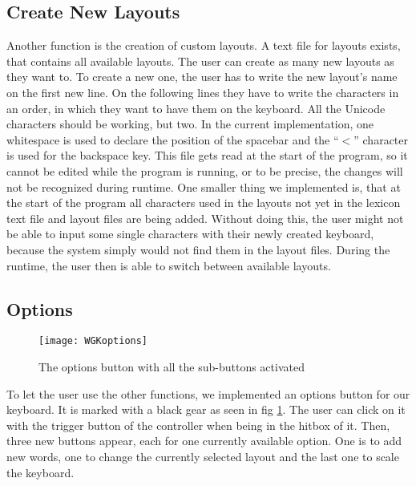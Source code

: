 \subsection{Create New Layouts}
Another function is the creation of custom layouts. A text file for layouts exists, that contains all available layouts. The user can create as many new layouts as they want to. To create a new one, the user has to write the new layout's name on the first new line. On the following lines they have to write the characters in an order, in which they want to have them on the keyboard. All the Unicode characters should be working, but two. In the current implementation, one whitespace is used to declare the position of the spacebar and the ``$<$'' character is used for the backspace key. This file gets read at the start of the program, so it cannot be edited while the program is running, or to be precise, the changes will not be recognized during runtime. One smaller thing we implemented is, that at the start of the program all characters used in the layouts not yet in the lexicon text file and layout files are being added. Without doing this, the user might not be able to input some single characters with their newly created keyboard, because the system simply would not find them in the layout files. During the runtime, the user then is able to switch between available layouts.

\subsection{Options}

\begin{figure}
    \centering
    \texttt{[image: WGKoptions]}
    \caption{The options button with all the sub-buttons activated}
    \label{fig:options}
\end{figure}

To let the user use the other functions, we implemented an options button for our keyboard. It is marked with a black gear as seen in fig \ref{fig:options}. The user can click on it with the trigger button of the controller when being in the hitbox of it. Then, three new buttons appear, each for one currently available option. One is to add new words, one to change the currently selected layout and the last one to scale the keyboard.


